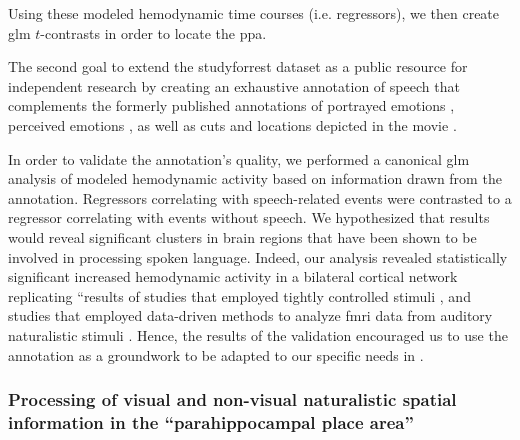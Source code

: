Using these modeled hemodynamic time courses (i.e. regressors), we then create
\ac{glm} $t$-contrasts in order to locate the \ac{ppa}.

The second goal to extend the studyforrest dataset as a public resource for
independent research by creating an exhaustive annotation of speech that
complements the formerly published annotations of portrayed emotions
\citep{labs2015portrayed}, perceived emotions \citep{lettieri2019emotionotopy},
as well as cuts and locations depicted in the movie \citep{haeusler2016cutanno}.

In order to validate the annotation's quality, we performed a canonical \ac{glm}
analysis of modeled hemodynamic activity based on information drawn from the
annotation.
Regressors correlating with speech-related events were contrasted to a regressor
correlating with events without speech.
We hypothesized that results would reveal significant clusters in brain regions
that have been shown to be involved in processing spoken language.
Indeed, our analysis revealed statistically significant increased hemodynamic
activity in a bilateral cortical network replicating ``results of studies that
employed tightly controlled stimuli \citep[s.][for reviews]{friederici2011brain,
hickok2007cortical,price2012twentyyears}, and studies that employed data-driven
methods to analyze \ac{fmri} data from auditory naturalistic stimuli
\citep{honey2012not, lerner2011topographic, silbert2014coupled}.
Hence, the results of the validation encouraged us to use the annotation as a
groundwork to be adapted to our specific needs in \citet{haeusler2022processing}.


\subsubsection{Processing of visual and non-visual naturalistic spatial
information in the ``parahippocampal place area''}



